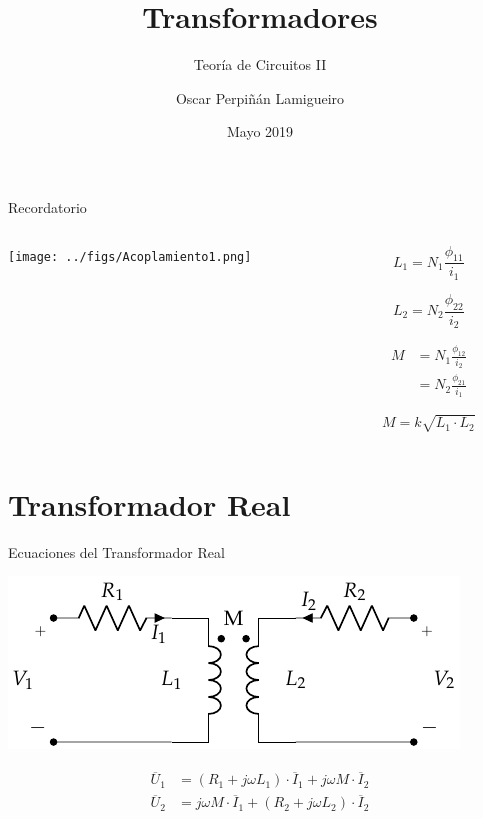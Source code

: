 \documentclass[xcolor={usenames,svgnames,dvipsnames}]{beamer}
\author{Oscar Perpiñán Lamigueiro}
\date{Mayo 2019}
\title{Transformadores}
\subtitle{Teoría de Circuitos II}
\begin{document}
\maketitle

\begin{frame}[label={sec:orgdec4f88}]{Recordatorio}
\begin{columns}
\begin{column}{0.7\columnwidth}
\begin{center}
\texttt{[image: ../figs/Acoplamiento1.png]}
\end{center}
\end{column}
\begin{column}{0.3\columnwidth}
\[
  L_1 = N_1 \frac{\phi_{11}}{i_1}
\]

\[
  L_2 = N_2 \frac{\phi_{22}}{i_2}
\]


\begin{align*}
  M &= N_1 \frac{\phi_{12}}{i_2}\\
    &= N_2 \frac{\phi_{21}}{i_1}
\end{align*}

\[
  M = k \sqrt{L_1 \cdot L_2}
\]
\end{column}
\end{columns}
\end{frame}

\section{Transformador Real}
\label{sec:orgc079ccb}

\begin{frame}[label={sec:orgc068016}]{Ecuaciones del Transformador Real}
\begin{center}
\includegraphics[height=0.45\textheight]{../figs/Trafo_Real.pdf}
\end{center}

\begin{align*}
  \overline{U}_1 &= (R_1 + j \omega L_1) \cdot \overline{I}_1 + j \omega M \cdot\overline{I}_2\\
  \overline{U}_2 &= j \omega M \cdot \overline{I}_1 + (R_2 + j \omega L_2) \cdot \overline{I}_2
\end{align*}
\end{frame}
\end{document}
